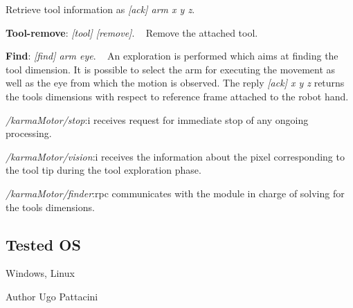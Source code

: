 \begin{DoxyItemize}
\begin{DoxyEnumerate}
 Retrieve tool information as {\itshape \mbox{[}ack\mbox{]} arm x y z}.
\item {\bfseries Tool-\/remove}\+: {\itshape \mbox{[}tool\mbox{]} \mbox{[}remove\mbox{]}}. ~\newline
 Remove the attached tool.
\item {\bfseries Find}\+: {\itshape \mbox{[}find\mbox{]} arm eye}. ~\newline
 An exploration is performed which aims at finding the tool dimension. It is possible to select the arm for executing the movement as well as the eye from which the motion is observed. The reply {\itshape \mbox{[}ack\mbox{]} x y z} returns the tool\textquotesingle{}s dimensions with respect to reference frame attached to the robot hand.
\end{DoxyEnumerate}
\item {\itshape /karma\+Motor/stop}\+:i receives request for immediate stop of any ongoing processing.
\item {\itshape /karma\+Motor/vision}\+:i receives the information about the pixel corresponding to the tool tip during the tool exploration phase.
\item {\itshape /karma\+Motor/finder}\+:rpc communicates with the module in charge of solving for the tool\textquotesingle{}s dimensions.
\end{DoxyItemize}\hypertarget{group__karmaToolProjection_tested_os_sec}{}\subsection{Tested OS}\label{group__karmaToolProjection_tested_os_sec}
Windows, Linux

\begin{DoxyAuthor}{Author}
Ugo Pattacini 
\end{DoxyAuthor}

